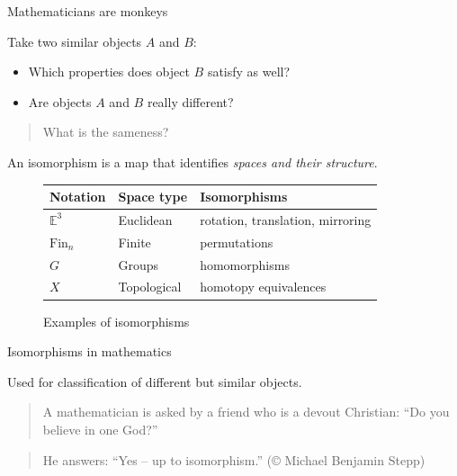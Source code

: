 \documentclass[english]{beamer}
\begin{document}
\begin{frame}{Mathematicians are monkeys}

Take two similar objects $A$ and $B$:

\begin{itemize}
 \item Which properties does object $B$ satisfy as well?
 \item Are objects $A$ and $B$ really different?
\end{itemize}


\begin{quotation}
 What is the sameness?
\end{quotation}

\begin{definition}
 An isomorphism is a map that identifies \emph{spaces and their structure}.
\end{definition}


\begin{figure}
\begin{centering}
\begin{table}[]
\begin{tabular}{lll}
\hline
Notation       & Space type         & Isomorphisms                          \\ \hline
$\mathbb{E}^3$ & Euclidean     & rotation, translation, mirroring      \\
$\text{Fin}_n$ & Finite        & permutations                          \\
$G$            & Groups             & homomorphisms                         \\ 
$X$            & Topological & homotopy equivalences
\end{tabular}
\end{table}
\caption{Examples of isomorphisms}
\end{centering}
\end{figure}
 

\end{frame}

\begin{frame}{Isomorphisms in mathematics}

Used for classification of different but similar objects.

\begin{quotation}
   
    A mathematician is asked by a friend who is a devout Christian: ``Do you believe in one God?'' 
\end{quotation}

    \pause{}
    
    \begin{quotation}
    He answers: ``Yes -- up to isomorphism.'' (© Michael Benjamin Stepp)
\end{quotation}
    
    





\end{frame}
\end{document}
